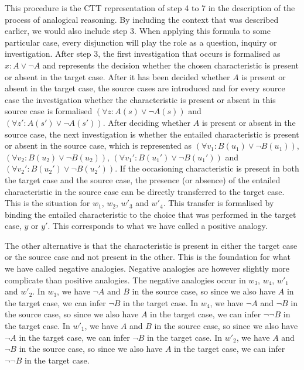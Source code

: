 				
		This procedure is the CTT representation of step 4 to 7 in the description of the process of analogical reasoning. By including the context that was described earlier, we would also include step 3. When applying this formula to some particular case, every disjunction will play the role as a question, inquiry or investigation. After step 3, the first investigation that occurs is formalised as $x : A \lor \neg A$ and represents the decision whether the chosen characteristic is present or absent in the target case. After it has been decided whether $A$ is present or absent in the target case, the source cases are introduced and for every source case the investigation whether the characteristic is present or absent in this source case is formalised $(\forall z : A(s) \lor \neg A(s))$ and $(\forall z' : A(s') \lor \neg A(s'))$. After deciding whether $A$ is present or absent in the source case, the next investigation is whether the entailed characteristic is present or absent in the source case, which is represented as $(\forall v_1 : B (u_1) \lor \neg B (u_1))$, $(\forall v_2 : B (u_2) \lor \neg B (u_2))$, $(\forall v_1' : B (u_1') \lor \neg B (u_1'))$ and $(\forall v_2' : B (u_2') \lor \neg B (u_2'))$. If the occasioning characteristic is present in both the target case and the source case, the presence (or absence) of the entailed characteristic in the source case can be directly transferred to the target case. This is the situation for $w_1$, $w_2$, $w'_3$ and $w'_4$. This transfer is formalised by binding the entailed characteristic to the choice that was performed in the target case, $y$ or $y'$. This corresponds to what we have called a positive analogy. 
		
		The other alternative is that the characteristic is present in either the target case or the source case and not present in the other. This is the foundation for what we have called negative analogies. Negative analogies are however slightly more complicate than positive analogies. The negative analogies occur in $w_3$, $w_4$, $w'_1$ and $w'_2$. In $w_3$, we have $\neg A$ and $B$ in the source case, so since we also have $A$ in the target case, we can infer $\neg B$ in the target case. In $w_4$, we have $\neg A$ and $\neg B$ in the source case, so since we also have $A$ in the target case, we can infer $\neg \neg B$ in the target case. In $w'_1$, we have $A$ and $B$ in the source case, so since we also have $\neg A$ in the target case, we can infer $\neg B$ in the target case. In $w'_2$, we have $A$ and $\neg B$ in the source case, so since we also have $A$ in the target case, we can infer $\neg \neg B$ in the target case. 
		

